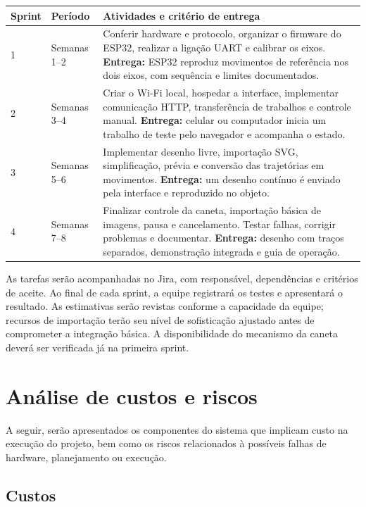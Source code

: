 \documentclass[10pt,a4paper]{article}
\begin{document}
\begin{center}
\small
\begin{tabularx}{\linewidth}{@{}P{1.1cm}P{1.6cm}Y@{}}
\toprule
\textbf{Sprint} & \textbf{Período} & \textbf{Atividades e critério de entrega}\\
 & Semanas 1--2 & Conferir hardware e protocolo, organizar o firmware do ESP32, realizar a ligação UART e calibrar os eixos. \textbf{Entrega:} ESP32 reproduz movimentos de referência nos dois eixos, com sequência e limites documentados.\\
2 & Semanas 3--4 & Criar o Wi-Fi local, hospedar a interface, implementar comunicação HTTP, transferência de trabalhos e controle manual. \textbf{Entrega:} celular ou computador inicia um trabalho de teste pelo navegador e acompanha o estado.\\
3 & Semanas 5--6 & Implementar desenho livre, importação SVG, simplificação, prévia e conversão das trajetórias em movimentos. \textbf{Entrega:} um desenho contínuo é enviado pela interface e reproduzido no objeto.\\
4 & Semanas 7--8 & Finalizar controle da caneta, importação básica de imagens, pausa e cancelamento. Testar falhas, corrigir problemas e documentar. \textbf{Entrega:} desenho com traços separados, demonstração integrada e guia de operação.\\
\bottomrule
\end{tabularx}
\end{center}

As tarefas serão acompanhadas no Jira, com responsável, dependências e
critérios de aceite. Ao final de cada sprint, a equipe registrará os testes
e apresentará o resultado. As estimativas serão revistas conforme a
capacidade da equipe; recursos de importação terão seu nível de sofisticação
ajustado antes de comprometer a integração básica. A disponibilidade do
mecanismo da caneta deverá ser verificada já na primeira sprint.


\section{Análise de custos e riscos}
A seguir, serão apresentados os componentes do sistema que implicam custo na execução do projeto, bem como os riscos relacionados à possíveis falhas de hardware, planejamento ou execução.
\subsection{Custos}
\end{document}
